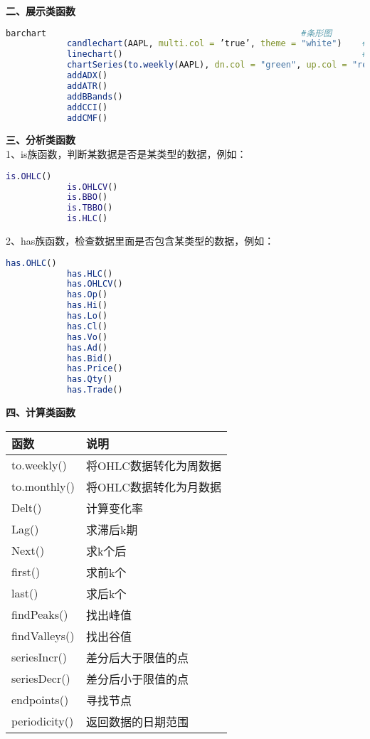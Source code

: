             \noindent \textbf{二、展示类函数}
                \begin{lstlisting}[language=R]
            barchart                                                  #条形图
            candlechart(AAPL, multi.col = ’true’, theme = "white")    #蜡烛图
            linechart()                                               #线图
            chartSeries(to.weekly(AAPL), dn.col = "green", up.col = "red")
            addADX()
            addATR()
            addBBands()
            addCCI()
            addCMF()
                \end{lstlisting}
            \textbf{三、分析类函数}\\
            1、is族函数，判断某数据是否是某类型的数据，例如：
                \begin{lstlisting}[language=Matlab]
            is.OHLC()
            is.OHLCV()
            is.BBO()
            is.TBBO()
            is.HLC()
                \end{lstlisting}
            2、has族函数，检查数据里面是否包含某类型的数据，例如：
                \begin{lstlisting}[language=R]
            has.OHLC()
            has.HLC()
            has.OHLCV()
            has.Op()
            has.Hi()
            has.Lo()
            has.Cl()
            has.Vo()
            has.Ad()
            has.Bid()
            has.Price()
            has.Qty()
            has.Trade()
                \end{lstlisting}
            \textbf{四、计算类函数}
              \begin{table}[H]
                  \centering
                \begin{tabular}{l|l}
                  \toprule
                  函数 & 说明\\
                  \midrule
            to.weekly() & 将OHLC数据转化为周数据\\
            to.monthly() & 将OHLC数据转化为月数据\\
            Delt() & 计算变化率\\
            Lag() & 求滞后k期\\
            Next() & 求k个后\\
            first() & 求前k个\\
            last() & 求后k个\\
            findPeaks() &  找出峰值\\
            findValleys() & 找出谷值\\
            seriesIncr() & 差分后大于限值的点\\
            seriesDecr() & 差分后小于限值的点\\
            endpoints() & 寻找节点\\
            periodicity() & 返回数据的日期范围\\
                  \bottomrule
                \end{tabular}
              \end{table}
